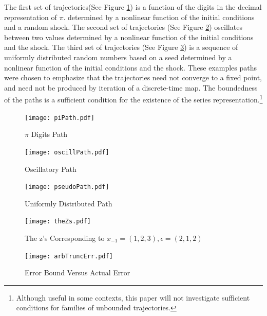 \documentclass[12pt]{article}
\begin{document}
The first set of trajectories(See Figure \ref{pipath}) is a function of
the digits in the decimal representation of $\pi$.  
determined by a nonlinear function of the initial conditions and a random shock.
The second set of trajectories (See Figure \ref{oscillpath}) oscillates between two values
determined by  a nonlinear function of the initial conditions and the shock.
The third set of trajectories (See Figure \ref{pseudopath}) is a sequence of uniformly distributed random
numbers based on a seed determined by  a nonlinear function of  the initial conditions and the shock.
These examples paths were chosen to emphasize that the trajectories
 need not converge to a fixed point, and 
need not be produced by iteration of a discrete-time map.
The boundedness of the paths is a sufficient condition for the existence 
of the series representation.\footnote{Although useful in some contexts,
this paper will not investigate sufficient conditions for families of
unbounded trajectories.}


\begin{figure}
  \centering
\texttt{[image: piPath.pdf]}
  
  \caption{$\pi$ Digits Path}\label{pipath}
\end{figure}
\begin{figure}
  \centering
\texttt{[image: oscillPath.pdf]}
  
  \caption{Oscillatory Path}\label{oscillpath}
\end{figure}

\begin{figure}
  \centering
\texttt{[image: pseudoPath.pdf]}
  \caption{Uniformly Distributed Path}\label{pseudopath}
\end{figure}

\begin{figure}
  \centering
\texttt{[image: theZs.pdf]}  
  \caption{The  z's Corresponding to  $x_{-1}=(1,2,3),\epsilon=(2,1,2)$} \label{arbFig}
\end{figure}

\begin{figure}
  \centering


\texttt{[image: arbTruncErr.pdf]}  
  \caption{Error Bound Versus Actual Error} \label{figArbTrunc}

\end{figure}
\end{document}
